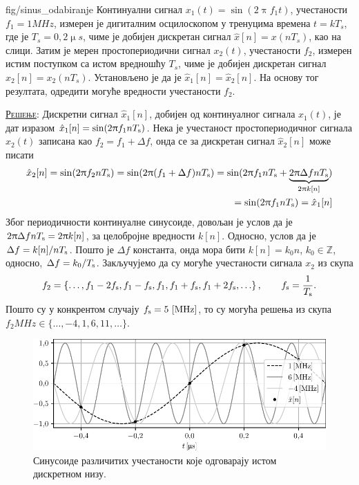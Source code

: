 \noindent
\begin{slikaDesno}{fig/sinus_odabiranje}
    \PID Континуални сигнал $x_1(t) = \sin(2\uppi f_1 t)$, учестаности $f_1 = 1\unit{MHz}$, измерен је 
    дигиталним осцилоскопом у тренуцима времена
    $t = kT_s$, где је ${T_s = 0,2\unit{\upmu s}}$, чиме је добијен дискретан сигнал $\hat x[n] = x(nT_s)$, као на слици.
    Затим је мерен простопериодични сигнал $x_2(t)$, учестаности $f_2$, измерен истим поступком 
    са истом вредношћу $T_s$, чиме је добијен дискретан сигнал $\hat x_2[n] = x_2(nT_s)$. 
    Установљено је да је $\hat x_1[n] = \hat x_2[n]$. 
    На основу тог резултата, одредити могуће вредности учестаности $f_2$.
\end{slikaDesno}

\textsc{\underline{Решење}}:
Дискретни сигнал $\hat x_1[n]$, добијен од континуалног сигнала $x_1(t)$, је дат изразом 
$
\hat x_1[n] = \sin(2\uppi f_1 n T_{\rm s}) 
$. Нека је учестаност простопериодичног сигнала $x_2(t)$ записана као $f_2 = f_1 + \Delta f$, онда се за дискретан сигнал 
$\hat x_2[n]$ може писати
\begin{eqnarray}
    \hat x_2[n] = \sin(2\uppi f_2 nT_{\rm s}) = \sin(2\uppi (f_1 + \Delta f) nT_{\rm s}) 
    = \sin(2\uppi f_1 n T_{\rm s} + \underbrace{2\uppi \Delta f n T_{\rm s}}_{2\uppi k[n]}  ) \\
    = \sin(2\uppi f_1 n T_{\rm s}) = \hat x_1[n]
\end{eqnarray}
Због периодичности континуалне синусоиде, довољан је услов да је $2\uppi \Delta f n T_{\rm s} = 2\uppi k[n]$, за целобројне вредности $k[n]$.
Односно, услов да је $\Delta f = k[n]/nT_{\rm s}$. Пошто је $\Delta f$ константа, онда мора бити $k[n] = k_0 n$, 
$k_0 \in \mathbb Z$, односно, $\Delta f = k_0/T_{\rm s}$. Закључујемо да су  могуће учестаности сигнала $x_2$
из скупа
\begin{eqnarray}
    f_2 = \left\{
    \ldots,
    f_1 - 2 f_{\rm s},
    f_1 - f_{\rm s},
    f_1,
    f_1 + f_{\rm s},
    f_1 + 2 f_{\rm s},
    \ldots
    \right\}, \qquad f_{\rm s} = \dfrac{1}{T_{\rm s}}.
\end{eqnarray}
Пошто су у конкрентом случају $f_{\rm s} = 5\,\left[\mathrm{MHz}\right]$, то су могућа решења из скупа
$f_2\unit{MHz} \in \{\ldots, -4 ,1, 6, 11, \ldots\}$.

\begin{figure}[ht!]
    \includegraphics{fig/sinus_odabiranje_rekonstrukcija.pdf}
    \caption{Синусоиде различитих учестаности које одговарају истом дискретном низу.}
\end{figure}

